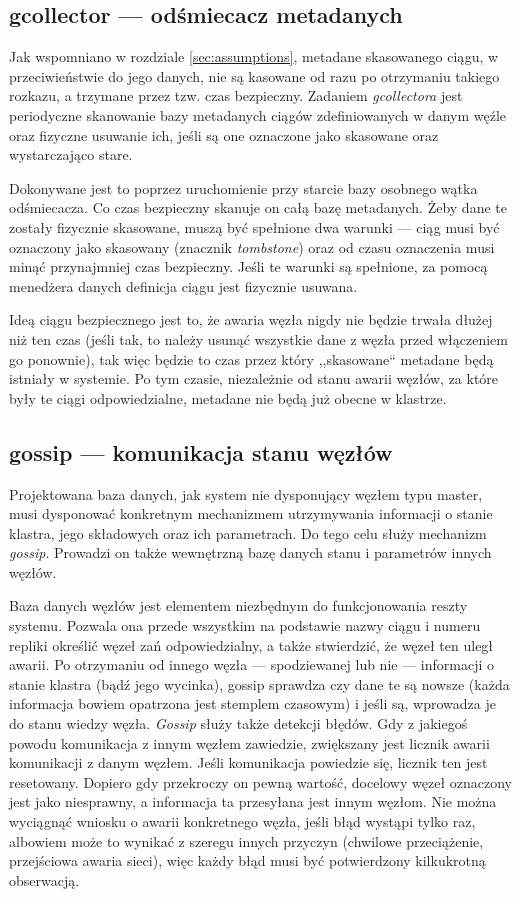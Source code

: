 \documentclass[a4paper,polish,12pt,twoside]{article}
\begin{document}
     \subsection{gcollector --- odśmiecacz metadanych}
             \label{sec:part:gcollector}
Jak wspomniano w rozdziale \ref{sec:assumptions}, metadane skasowanego ciągu, w przeciwieństwie do jego danych, nie są kasowane od razu po otrzymaniu takiego rozkazu, a trzymane przez tzw. czas bezpieczny. Zadaniem \textit{gcollectora} jest periodyczne skanowanie bazy metadanych ciągów zdefiniowanych w danym węźle oraz fizyczne usuwanie ich, jeśli są one oznaczone jako skasowane oraz wystarczająco stare.

Dokonywane jest to poprzez uruchomienie przy starcie bazy osobnego wątka odśmiecacza. Co czas bezpieczny skanuje on całą bazę metadanych. Żeby dane te zostały fizycznie skasowane, muszą być spełnione dwa warunki --- ciąg musi być oznaczony jako skasowany (znacznik \textit{tombstone}) oraz od czasu oznaczenia musi minąć przynajmniej czas bezpieczny. Jeśli te warunki są spełnione, za pomocą menedżera danych definicja ciągu jest fizycznie usuwana.

Ideą ciągu bezpiecznego jest to, że awaria węzła nigdy nie będzie trwała dłużej niż ten czas (jeśli tak, to należy usunąć wszystkie dane z węzła przed włączeniem go ponownie), tak więc będzie to czas przez który ,,skasowane`` metadane będą istniały w systemie. Po tym czasie, niezależnie od stanu awarii węzłów, za które były te ciągi odpowiedzialne, metadane nie będą już obecne w klastrze.

     \subsection{gossip --- komunikacja stanu węzłów}
		Projektowana baza danych, jak system nie dysponujący węzłem typu master, musi dysponować konkretnym mechanizmem utrzymywania informacji o stanie klastra, jego składowych oraz ich parametrach. Do tego celu służy mechanizm \textit{gossip}. Prowadzi on także wewnętrzną bazę danych stanu i parametrów innych węzłów.

	Baza danych węzłów jest elementem niezbędnym do funkcjonowania reszty systemu. Pozwala ona przede wszystkim na podstawie nazwy ciągu i numeru repliki określić węzeł zań odpowiedzialny, a także stwierdzić, że węzeł ten uległ awarii. Po otrzymaniu od innego węzła --- spodziewanej lub nie --- informacji o stanie klastra (bądź jego wycinka), gossip sprawdza czy dane te są nowsze (każda informacja bowiem opatrzona jest stemplem czasowym) i jeśli są, wprowadza je do stanu wiedzy węzła. \textit{Gossip} służy także detekcji błędów. Gdy z jakiegoś powodu komunikacja z innym węzłem zawiedzie, zwiększany jest licznik awarii komunikacji z danym węzłem. Jeśli komunikacja powiedzie się, licznik ten jest resetowany. Dopiero gdy przekroczy on pewną wartość, docelowy węzeł oznaczony jest jako niesprawny, a informacja ta przesyłana jest innym węzłom. Nie można wyciągnąć wniosku o awarii konkretnego węzła, jeśli błąd wystąpi tylko raz, albowiem może to wynikać z szeregu innych przyczyn (chwilowe przeciążenie, przejściowa awaria sieci), więc każdy błąd musi być potwierdzony kilkukrotną obserwacją.
\end{document}
